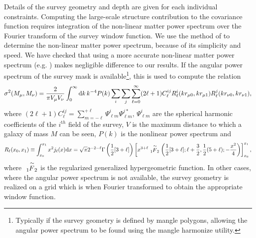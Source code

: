 Details of the survey geometry and depth are given for each individual constraints. Computing the large-scale structure contribution to the covariance function requires integration of the non-linear matter power spectrum over the Fourier transform of the survey window function. We use the method of \cite{peacock_non-linear_1996} to determine the non-linear matter power spectrum, because of its simplicity and speed. We have checked that using a more accurate non-linear matter power spectrum (e.g. \citealt{lawrence_coyote_2010}) makes negligible difference to our results. If the angular power spectrum of the survey mask is available\footnote{Typically if the survey geometry is defined by \protect\gls{mangle} polygons, allowing the angular power spectrum to be found using the \protect\gls{mangle} {\normalfont \ttfamily harmonize} utility.}, this is used to compute the relation
\begin{equation}
  \sigma^2(M_\mu,M_\nu) = {2 \over \pi V_\mu V_\nu}\int_0^\infty {\mathrm d} k\, k^{-4} P(k) \sum_i \sum_j \sum_{\ell=0}^\infty (2\ell+1) C^{ij}_\ell R^i_{\ell}(kr_{\mu 0},kr_{\mu 1}) R^j_{\ell}(kr_{\nu 0},kr_{\nu 1}),
\end{equation}
where $(2\ell+1) C^{ij}_\ell = \sum_{m=-\ell}^{+\ell} \Psi^i_{\ell m} \Psi^{j*}_{\ell m}$, $\Psi^i_{\ell m}$ are the spherical harmonic coefficients of the $i^{\mathrm th}$ field of the survey, $V$ is the maximum distance to which a galaxy of mass $M$ can be seen, $P(k)$ is the nonlinear power spectrum and
\begin{equation}
 R_{\ell}(x_0,x_1) \equiv \int_{x_0}^{x_1} x^2 j_\ell(x) {\mathrm d}x = \sqrt{\pi} 2^{-2-\ell} \Gamma\left({1\over 2}[3+\ell]\right) \left[ x^{3+\ell} \tensor*[_1]{\stackrel{\sim}{F}}{_2} \left({1\over 2}[3+\ell]; \ell+{3\over 2},{1\over 2}(5+\ell);-{x^2\over 4}\right)\right]_{x_0}^{x_1},
\end{equation}
where $\tensor*[_1]{\stackrel{\sim}{F}}{_2}$ is the regularized generalized hypergeometric function. In other cases, where the angular power spectrum is not available, the survey geometry is realized on a grid which is when Fourier transformed to obtain the appropriate window function.

